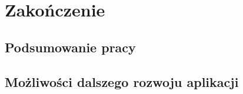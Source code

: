 
\chapter{Zakończenie}
\label{ch:zakonczenie}

\section {Podsumowanie pracy}
\label {sec: podsumowanie-pracy}

\section {Możliwości dalszego rozwoju aplikacji}
\label {sec: dalszy-rozwoj}

